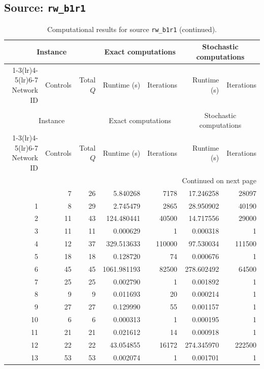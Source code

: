 \documentclass{article}
\begin{document}
\begin{landscape}
\subsection*{Source: \texttt{rw\_b1r1}}

\begin{longtable}{rrrrrrr}
\caption{Computational results for source \texttt{rw\_b1r1}.}\\
\toprule
\multicolumn{3}{c}{Instance} & \multicolumn{2}{c}{Exact computations} & \multicolumn{2}{c}{Stochastic computations} \\
\cmidrule(lr){1-3}\cmidrule(lr){4-5}\cmidrule(lr){6-7}
Network ID & Controls & Total $Q$ & Runtime (s) & Iterations & Runtime (s) & Iterations \\
\midrule
\endfirsthead
\caption[]{Computational results for source \texttt{rw\_b1r1} (continued).}\\
\toprule
\multicolumn{3}{c}{Instance} & \multicolumn{2}{c}{Exact computations} & \multicolumn{2}{c}{Stochastic computations} \\
\cmidrule(lr){1-3}\cmidrule(lr){4-5}\cmidrule(lr){6-7}
Network ID & Controls & Total $Q$ & Runtime (s) & Iterations & Runtime (s) & Iterations \\
\midrule
\endhead
\midrule
\multicolumn{7}{r}{Continued on next page} \\
\endfoot
\bottomrule
\endlastfoot
0 & 7 & 26 & 5.840268 & 7178 & 17.246258 & 28097 \\
1 & 8 & 29 & 2.745479 & 2865 & 28.950902 & 40190 \\
2 & 11 & 43 & 124.480441 & 40500 & 14.717556 & 29000 \\
3 & 11 & 11 & 0.000629 & 1 & 0.000318 & 1 \\
4 & 12 & 37 & 329.513633 & 110000 & 97.530034 & 111500 \\
5 & 18 & 18 & 0.128720 & 74 & 0.000676 & 1 \\
6 & 45 & 45 & 1061.981193 & 82500 & 278.602492 & 64500 \\
7 & 25 & 25 & 0.002790 & 1 & 0.001892 & 1 \\
8 & 9 & 9 & 0.011693 & 20 & 0.000214 & 1 \\
9 & 27 & 27 & 0.129990 & 55 & 0.001157 & 1 \\
10 & 6 & 6 & 0.000313 & 1 & 0.000195 & 1 \\
11 & 21 & 21 & 0.021612 & 14 & 0.000918 & 1 \\
12 & 22 & 22 & 43.054855 & 16172 & 274.345970 & 222500 \\
13 & 53 & 53 & 0.002074 & 1 & 0.001701 & 1 \\

\end{longtable}
\end{landscape}
\end{document}
